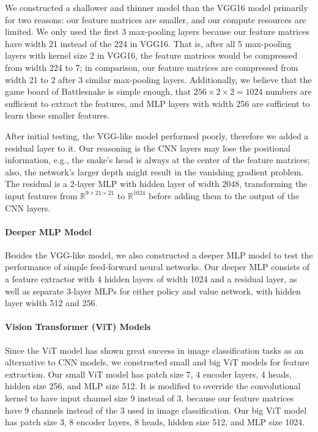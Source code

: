\documentclass[conference]{IEEEtran}
\begin{document}
We constructed a shallower and thinner model than the VGG16 model primarily for
two reasons: our feature matrices are smaller,
and our compute resources are limited.
We only used the first 3 max-pooling layers because our feature matrices have
width 21 instead of the 224 in VGG16. That is,
after all 5 max-pooling layers with kernel size 2 in VGG16,
the feature matrices would be compressed from width 224 to 7; in comparison,
our feature matrices are compressed from width 21 to 2 after 3 similar
max-pooling layers.
Additionally, we believe that the game board of Battlesnake is simple enough,
that $256\times 2\times 2=1024$ numbers are sufficient to extract the features,
and MLP layers with width 256 are sufficient to learn these smaller features.

After initial testing, the VGG-like model performed poorly,
therefore we added a residual layer to it.
Our reasoning is the CNN layers may lose the positional information,
e.g., the snake's head is always at the center of the feature matrices;
also, the network's larger depth might result in the vanishing gradient problem.
The residual is a 2-layer MLP with hidden layer of width 2048,
transforming the input features from $\mathbb R^{9\times 21\times 21}$ to
$\mathbb R^{1024}$ before adding them to the output of the CNN layers.

\paragraph{Deeper MLP Model}
Besides the VGG-like model,
we also constructed a deeper MLP model to test the performance of simple
feed-forward neural networks.
Our deeper MLP consists of a feature extractor with 4 hidden layers of width
1024 and a residual layer,
as well as separate 3-layer MLPs for either policy and value network,
with hidden layer width 512 and 256.

\paragraph{Vision Transformer (ViT) Models}
Since the ViT model has shown great success in image classification tasks as an
alternative to CNN models,
we constructed small and big ViT models for feature extraction.
Our small ViT model has patch size 7, 4 encoder layers, 4 heads, hidden size 256,
and MLP size 512.
It is modified to override the convolutional kernel to have input channel size 9
instead of 3,
because our feature matrices have 9 channels instead of the 3 used in image
classification.
Our big ViT model has patch size 3, 8 encoder layers, 8 heads, hidden size 512,
and MLP size 1024.
\end{document}
